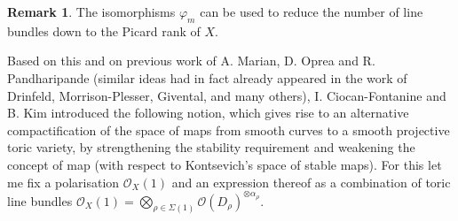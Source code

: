 \documentclass[11pt]{amsart}
\newcommand{\OO}{\mathcal{O}}
\theoremstyle{definition}
\theoremstyle{definition}
\newtheorem{rmk}[thm]{Remark}
\begin{document}
\begin{rmk}
 The isomorphisms $\varphi_m$ can be used to reduce the number of line bundles down to the Picard rank of $X$.
\end{rmk}

Based on this and on previous work of A. Marian, D. Oprea and R. Pandharipande \cite{MOP} (similar ideas had in fact already appeared in the work of Drinfeld, Morrison-Plesser, Givental, and many others), I. Ciocan-Fontanine and B. Kim introduced the following notion, which gives rise to an alternative compactification of the space of maps from smooth curves to a smooth projective toric variety, by strengthening the stability requirement and weakening the concept of map (with respect to Kontsevich's space of stable maps). For this let me fix a polarisation $\OO_X(1)$ and an expression thereof as a combination of toric line bundles $\OO_X(1)=\bigotimes_{\rho\in\Sigma(1)}\OO(D_\rho)^{\otimes \alpha_\rho}$.
\end{document}
